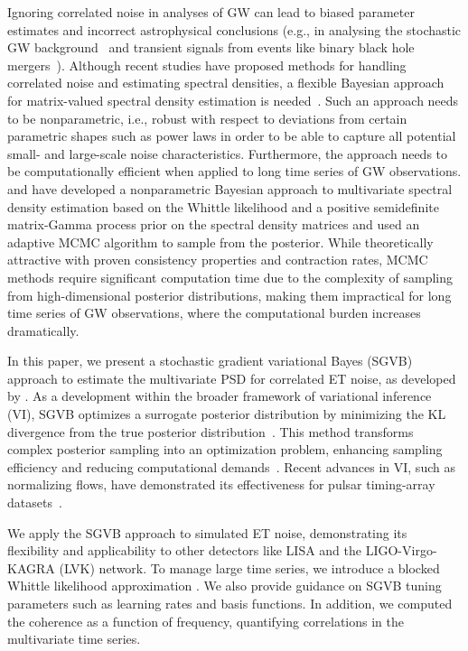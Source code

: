 \documentclass[%
 reprint,
 amsmath,amssymb,
 aps,
 nofootinbib,
]{revtex4-2}
\begin{document}
Ignoring correlated noise in analyses of \ac{GW} can lead to biased parameter estimates and incorrect astrophysical conclusions (e.g., in analysing the stochastic \ac{GW} background~\cite{Thrane_correlations_SGWB, Christensen_2019_SGWB, boileau2022figures} and transient signals from events like binary black hole mergers~\cite{Cireddu:2023:arXiv}). 
Although recent studies have proposed methods for handling correlated noise and estimating spectral densities, a flexible Bayesian approach for matrix-valued spectral density estimation is needed~\cite{Cireddu:2023:arXiv,JanssensKamiel2023Ffps}. 
Such an approach needs to be nonparametric, i.e., robust with respect to deviations from certain parametric shapes such as power laws in order to be able to capture all potential small- and large-scale noise characteristics.
Furthermore, the approach needs to be computationally efficient when applied to long time series of \ac{GW} observations. 
\citet{MeierAlexander2020Bnao} and \citet{Liu2023} have developed a nonparametric Bayesian approach to multivariate spectral density estimation based on the Whittle likelihood and a positive semidefinite matrix-Gamma process prior on the spectral density matrices and used an adaptive MCMC algorithm to sample from the posterior. 
While theoretically attractive with proven consistency properties and contraction rates, MCMC methods require significant computation time due to the complexity of sampling from high-dimensional posterior distributions, making them impractical for long time series of \ac{GW} observations, where the computational burden increases dramatically.

In this paper, we present a stochastic gradient variational Bayes (SGVB)  approach to estimate the multivariate \ac{PSD} for correlated \ac{ET} noise, as developed by \citet{Hu2023}. As a development within the broader framework of variational inference (VI), SGVB optimizes a surrogate posterior distribution by minimizing the \ac{KL} divergence from the true posterior distribution~\cite{Jordan1999,Wainwright2008,Blei2017}.  
This method transforms complex posterior sampling into an optimization problem, enhancing sampling efficiency and reducing computational demands~\cite{Blei2006,kingma2022}.
Recent advances in VI, such as normalizing flows, have demonstrated its effectiveness for pulsar timing-array datasets~\cite{Vallisneri2024}. 

We apply the SGVB approach to simulated ET noise, demonstrating its flexibility and applicability to other detectors like LISA and the LIGO-Virgo-KAGRA (LVK) network.
To manage large time series, we introduce a blocked Whittle likelihood approximation \cite{vu2024}. 
We also provide guidance on SGVB tuning parameters such as learning rates and basis functions. 
In addition, we computed the coherence as a function of frequency, quantifying correlations in the multivariate time series.
\end{document}
